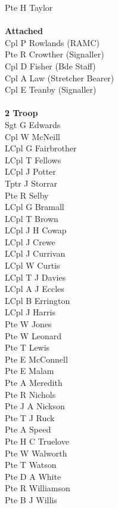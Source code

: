 \begin{multicols}{2}
  Pte H Taylor \\
  \\
  \textbf{Attached} \\
  Cpl P Rowlands (RAMC) \\
  Pte R Crowther (Signaller) \\
  Cpl D Fisher (Bde Staff) \\
  Cpl A Law (Stretcher Bearer) \\
  Cpl E Teanby (Signaller) \\
  \\
  \textbf{2 Troop} \\
  Sgt G Edwards \\
  Cpl W McNeill \\
  LCpl G Fairbrother \\
  LCpl T Fellows \\
  LCpl J Potter \\
  Tptr J Storrar \\
  Pte R Selby \\
  LCpl G Bramall \\
  LCpl T Brown \\
  LCpl J H Cowap \\
  LCpl J Crewe \\
  LCpl J Currivan \\
  LCpl W Curtis \\
  LCpl T J Davies \\
  LCpl A J Eccles \\
  LCpl B Errington \\
  LCpl J Harris \\
  Pte W Jones \\
  Pte W Leonard \\
  Pte T Lewis \\
  Pte E McConnell \\
  Pte E Malam \\
  Pte A Meredith \\
  Pte R Nichols \\
  Pte J A Nickson \\
  Pte T J Ruck \\
  Pte A Speed \\
  Pte H C Truelove \\
  Pte W Walworth \\
  Pte T Watson \\
  Pte D A White \\
  Pte R Williamson \\
  Pte B J Willis \\
  \\

\end{multicols}
